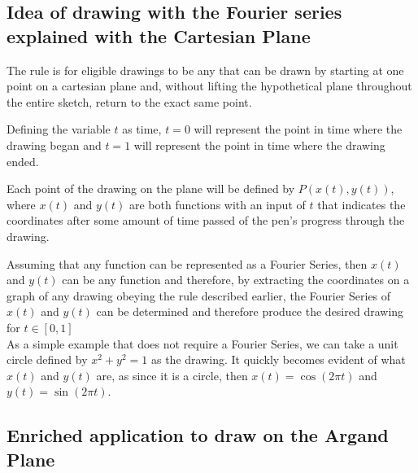 \documentclass[letterpaper, 12pt]{article}
\begin{document}


\subsection{Idea of drawing with the Fourier series explained with the Cartesian Plane}

The rule is for eligible drawings to be any that can be drawn by starting at one point
on a cartesian plane and, without lifting the hypothetical plane throughout the entire
sketch, return to the exact same point.

Defining the variable \(t\) as time, \(t = 0\) will represent the point in time
where the drawing began and \(t = 1\) will represent the point in time where
the drawing ended.

Each point of the drawing on the plane will be defined by \(P(x(t), y(t))\),
where \(x(t)\) and \(y(t)\) are both functions with an input of \(t\) that
indicates the coordinates after some amount of time passed of the pen's progress
through the drawing.

Assuming that any function can be represented as a Fourier Series, then
\(x(t)\) and \(y(t)\) can be any function and therefore, by extracting
the coordinates on a graph of any drawing obeying the rule described earlier,
the Fourier Series of \(x(t)\) and \(y(t)\) can be determined and therefore
produce the desired drawing for \(t\in [0,1]\)
\\

As a simple example that does not require a Fourier Series,
we can take a unit circle defined by \( x^2 + y^2 = 1 \) as the drawing.
It quickly becomes evident of what \(x(t)\) and \(y(t)\) are, as since it is a circle,
then \(x(t) = \cos(2\pi t)\) and \(y(t) = \sin(2\pi t)\).

\subsection{Enriched application to draw on the Argand Plane} \label{sec:big_guy}
\end{document}
